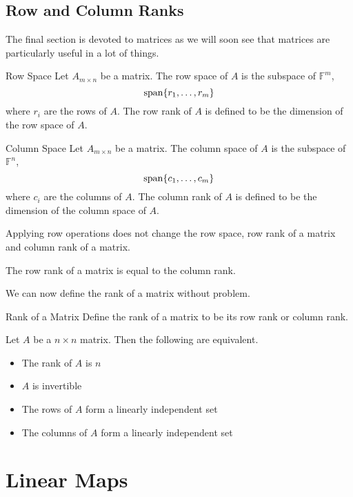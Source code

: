 \documentclass[a4paper]{article}
\begin{document}
\subsection{Row and Column Ranks}
The final section is devoted to matrices as we will soon see that matrices are particularly useful in a lot of things. 
\begin{defn}{Row Space}{} Let $A_{m\times n}$ be a matrix. The row space of $A$ is the subspace of $\mathbb{F}^m$, $$\operatorname{span}\{r_1,\dots,r_m\}$$ where $r_i$ are the rows of $A$. The row rank of $A$ is defined to be the dimension of the row space of $A$. 
\end{defn}

\begin{defn}{Column Space}{} Let $A_{m\times n}$ be a matrix. The column space of $A$ is the subspace of $\mathbb{F}^n$, $$\operatorname{span}\{c_1,\dots,c_m\}$$ where $c_i$ are the columns of $A$. The column rank of $A$ is defined to be the dimension of the column space of $A$. 
\end{defn}

\begin{lmm}{}{} Applying row operations does not change the row space, row rank of a matrix and column rank of a matrix. 
\end{lmm}

\begin{thm}{}{} The row rank of a matrix is equal to the column rank. 
\end{thm}

We can now define the rank of a matrix without problem. 

\begin{defn}{Rank of a Matrix}{} Define the rank of a matrix to be its row rank or column rank. 
\end{defn}

\begin{prp}{}{} Let $A$ be a $n\times n$ matrix. Then the following are equivalent. 
\begin{itemize}
\item The rank of $A$ is $n$
\item $A$ is invertible
\item The rows of $A$ form a linearly independent set
\item The columns of $A$ form a linearly independent set
\end{itemize}
\end{prp}

\pagebreak
\section{Linear Maps}
\end{document}
